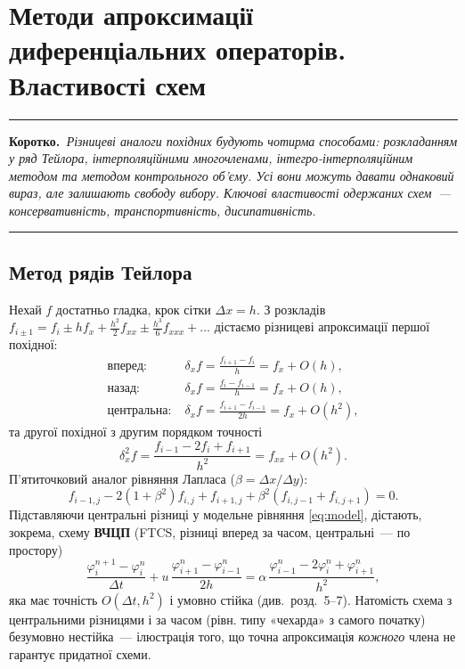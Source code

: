 \documentclass[12pt,a4paper]{article}
\theoremstyle{definition}
\theoremstyle{plain}
\newenvironment{korotko}
  {\par\medskip\noindent\begingroup\color{accent!75!black}\rule{\linewidth}{0.4pt}\par
   \noindent\textbf{Коротко.}\itshape\,}
  {\par\noindent\rule{\linewidth}{0.4pt}\endgroup\medskip}
\begin{document}
\newpage
\section{Методи апроксимації диференціальних операторів. Властивості схем}

\begin{korotko}
Різницеві аналоги похідних будують чотирма способами: розкладанням у
\emph{ряд Тейлора}, \emph{інтерполяційними многочленами},
\emph{інтегро-інтерполяційним методом} та \emph{методом контрольного
об'єму}. Усі вони можуть давати однаковий вираз, але залишають свободу
вибору. Ключові властивості одержаних схем~--- \emph{консервативність},
\emph{транспортивність}, \emph{дисипативність}.
\end{korotko}

\subsection{Метод рядів Тейлора}
Нехай $f$ достатньо гладка, крок сітки $\Delta x=h$. З розкладів
$f_{i\pm1}=f_i\pm h f_x+\tfrac{h^2}{2}f_{xx}\pm\tfrac{h^3}{6}f_{xxx}+\dots$
дістаємо різницеві апроксимації першої похідної:
\begin{align}
  \text{вперед:}\;& \delta_x f=\frac{f_{i+1}-f_i}{h}=f_x+O(h),\\
  \text{назад:}\;& \delta_x f=\frac{f_i-f_{i-1}}{h}=f_x+O(h),\\
  \text{центральна:}\;& \delta_x f=\frac{f_{i+1}-f_{i-1}}{2h}=f_x+O(h^2),
\end{align}
та другої похідної з другим порядком точності
\begin{equation}
  \delta_x^2 f=\frac{f_{i-1}-2f_i+f_{i+1}}{h^2}=f_{xx}+O(h^2).
\end{equation}
П'ятиточковий аналог рівняння Лапласа ($\beta=\Delta x/\Delta y$):
\[
  f_{i-1,j}-2(1+\beta^2)f_{i,j}+f_{i+1,j}
  +\beta^2(f_{i,j-1}+f_{i,j+1})=0 .
\]
Підставляючи центральні різниці у модельне рівняння \eqref{eq:model},
дістають, зокрема, схему \textbf{ВЧЦП} (FTCS, різниці вперед за часом,
центральні~--- по простору)
\begin{equation}
  \frac{\varphi_i^{n+1}-\varphi_i^n}{\Delta t}
  +u\,\frac{\varphi_{i+1}^n-\varphi_{i-1}^n}{2h}
  =\alpha\,\frac{\varphi_{i-1}^n-2\varphi_i^n+\varphi_{i+1}^n}{h^2},
  \label{eq:ftcs}
\end{equation}
яка має точність $O(\Delta t,h^2)$ і умовно стійка (див.~розд.~5--7).
Натомість схема з центральними різницями і за часом (рівн. типу
«чехарда» з самого початку) безумовно нестійка~--- ілюстрація того, що
точна апроксимація \emph{кожного} члена не гарантує придатної схеми.
\end{document}
